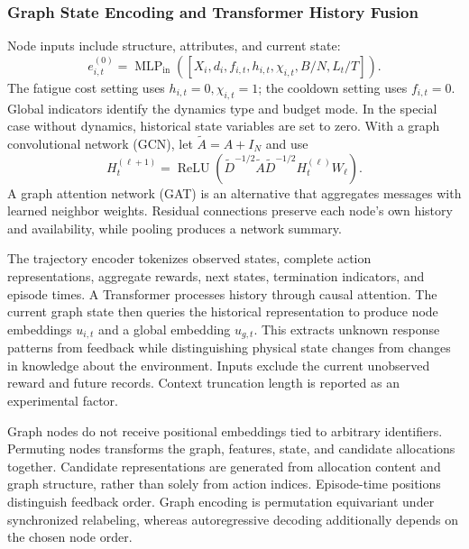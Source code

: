\documentclass[a4paper,11pt]{article}
\numberwithin{equation}{section}
\begin{document}
\subsubsection{Graph State Encoding and Transformer History Fusion}
Node inputs include structure, attributes, and current state:
\begin{equation}
e_{i,t}^{(0)}=\operatorname{MLP}_{\mathrm{in}}
([X_i,d_i,f_{i,t},h_{i,t},\chi_{i,t},B/N,L_t/T]).
\end{equation}
The fatigue cost setting uses $h_{i,t}=0,\chi_{i,t}=1$; the cooldown setting uses $f_{i,t}=0$. Global indicators identify the dynamics type and budget mode. In the special case without dynamics, historical state variables are set to zero. With a graph convolutional network (GCN)\citep{kipf2017}, let $\widetilde A=A+I_N$ and use
\begin{equation}
H_t^{(\ell+1)}=\operatorname{ReLU}
(\widetilde D^{-1/2}\widetilde A\widetilde D^{-1/2}H_t^{(\ell)}W_\ell).
\end{equation}
A graph attention network (GAT)\citep{velickovic2018} is an alternative that aggregates messages with learned neighbor weights. Residual connections preserve each node's own history and availability, while pooling produces a network summary.

The trajectory encoder tokenizes observed states, complete action representations, aggregate rewards, next states, termination indicators, and episode times. A Transformer\citep{vaswani2017} processes history through causal attention. The current graph state then queries the historical representation to produce node embeddings $u_{i,t}$ and a global embedding $u_{g,t}$. This extracts unknown response patterns from feedback while distinguishing physical state changes from changes in knowledge about the environment. Inputs exclude the current unobserved reward and future records. Context truncation length is reported as an experimental factor.

Graph nodes do not receive positional embeddings tied to arbitrary identifiers. Permuting nodes transforms the graph, features, state, and candidate allocations together. Candidate representations are generated from allocation content and graph structure, rather than solely from action indices. Episode-time positions distinguish feedback order. Graph encoding is permutation equivariant under synchronized relabeling, whereas autoregressive decoding additionally depends on the chosen node order.
\end{document}
